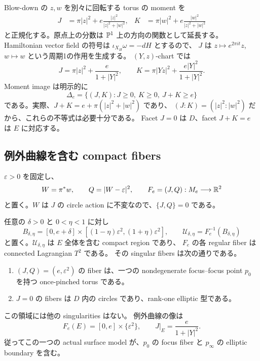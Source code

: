 Blow-down の $z,w$ を別々に回転する torus の moment を
\begin{align}
 J&=\pi|z|^2+e\frac{|z|^2}{|z|^2+|w|^2},&
 K&=\pi|w|^2+e\frac{|w|^2}{|z|^2+|w|^2}
 \label{exc:toric-moments}
\end{align}
と正規化する。原点上の分数は $\mathbb P^1$ 上の方向の関数として延長する。
Hamiltonian vector field の符号は $\iota_{X_H}\omega=-dH$ とするので、
$J$ は $z\mapsto e^{2\pi it}z$, $w\mapsto w$ という周期1の作用を生成する。
$(Y,z)$-chart では
\begin{equation}\label{exc:chart-moments}
 J=\pi|z|^2+\frac{e}{1+|Y|^2},\qquad
 K=\pi|Yz|^2+\frac{e|Y|^2}{1+|Y|^2}.
\end{equation}
Moment image は明示的に
\begin{equation}\label{exc:polytope}
 \Delta_e=\{(J,K):J\ge0,\ K\ge0,\ J+K\ge e\}
\end{equation}
である。実際、$J+K=e+\pi(|z|^2+|w|^2)$ であり、
$(J:K)=(|z|^2:|w|^2)$ だから、これらの不等式は必要十分である。
Facet $J=0$ は $D$、facet $J+K=e$ は $E$ に対応する。

\subsection{例外曲線を含む compact fibers}

$\varepsilon>0$ を固定し、
\begin{equation}\label{exc:fibration}
 W=\pi^*w,
 \qquad Q=|W-\varepsilon|^2,
 \qquad F_e=(J,Q):M_e\longrightarrow\mathbb R^2
\end{equation}
と置く。$W$ は $J$ の circle action に不変なので、$\{J,Q\}=0$ である。

\begin{theorem}
\label{exc:bridge}
任意の $\delta>0$ と $0<\eta<1$ に対し
\[
 B_{\delta,\eta}= [0,e+\delta]\times
   [(1-\eta)\varepsilon^2,(1+\eta)\varepsilon^2],
 \qquad \mathcal U_{\delta,\eta}=F_e^{-1}(B_{\delta,\eta})
\]
と置く。$\mathcal U_{\delta,\eta}$ は $E$ 全体を含む compact region であり、
$F_e$ の各 regular fiber は connected Lagrangian $T^2$ である。
その singular fibers は次の通りである。
\begin{enumerate}
\item $(J,Q)=(e,\varepsilon^2)$ の fiber は、一つの nondegenerate focus--focus point
 $p_0$ を持つ once-pinched torus である。
\item $J=0$ の fibers は $D$ 内の circles であり、rank-one elliptic 型である。
\end{enumerate}
この領域には他の singularities はない。
例外曲線の像は
\begin{equation}\label{exc:e-image}
 F_e(E)=[0,e]\times\{\varepsilon^2\},\qquad
 J|_E=\frac{e}{1+|Y|^2}.
\end{equation}
従ってこの一つの actual surface model が、$p_0$ の focus fiber と
$p_\infty$ の elliptic boundary を含む。
\end{theorem}

